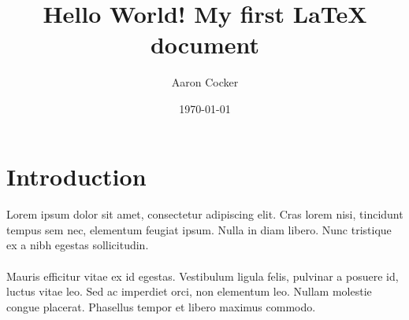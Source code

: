 \documentclass[a4paper,12pt]{article}
\begin{document}
\title{Hello World! My first LaTeX document}
\author{Aaron Cocker}
\date{\today}
\maketitle

\section{Introduction}

\paragraph{}
Lorem ipsum dolor sit amet, consectetur adipiscing elit. Cras lorem nisi, tincidunt tempus sem nec, elementum feugiat ipsum. Nulla in diam libero. Nunc tristique ex a nibh egestas sollicitudin. 

\paragraph{}
Mauris efficitur vitae ex id egestas. Vestibulum ligula felis, pulvinar a posuere id, luctus vitae leo. Sed ac imperdiet orci, non elementum leo. Nullam molestie congue placerat. Phasellus tempor et libero maximus commodo.
\end{document}
